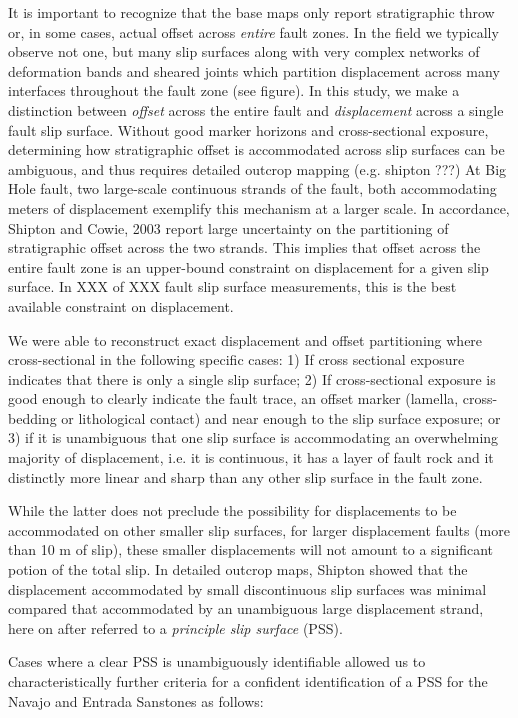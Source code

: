 \documentclass[12pt,a4paper]{article}
\begin{document}
It is important to recognize that the base maps only report stratigraphic throw or, in some cases, actual offset across \textit{entire} fault zones. In the field we typically observe not one, but many slip surfaces along with very complex networks of deformation bands and sheared joints which partition displacement across many interfaces throughout the fault zone (see figure). In this study, we make a distinction between \textit{offset} across the entire fault and \textit{displacement} across a single fault slip surface. Without good marker horizons and cross-sectional exposure, determining how stratigraphic offset is accommodated across slip surfaces can be ambiguous, and thus requires detailed outcrop mapping (e.g. shipton ???) At Big Hole fault, two large-scale continuous strands of the fault, both accommodating meters of displacement exemplify this mechanism at a larger scale. In accordance, Shipton and Cowie, 2003 report large uncertainty on the partitioning of stratigraphic offset across the two strands. This implies that offset across the entire fault zone is an upper-bound constraint on displacement for a given slip surface. In XXX of XXX fault slip surface measurements, this is the best available constraint on displacement. 

We were able to reconstruct exact displacement and offset partitioning where cross-sectional in the following specific cases: 1) If cross sectional exposure indicates that there is only a single slip surface; 2) If cross-sectional exposure is good enough to clearly indicate the fault trace, an offset marker (lamella, cross-bedding or lithological contact) and near enough to the slip surface exposure; or 3) if it is unambiguous that one slip surface is accommodating an overwhelming majority of displacement, i.e. it is continuous, it has a layer of fault rock and it distinctly more linear and sharp than any other slip surface in the fault zone. 

While the latter does not preclude the possibility for displacements to be accommodated on other smaller slip surfaces, for larger displacement faults (more than 10 m of slip), these smaller displacements will not amount to a significant potion of the total slip. In detailed outcrop maps, Shipton showed that the displacement accommodated by small discontinuous slip surfaces was minimal compared that accommodated by an unambiguous large displacement strand, here on after referred to a \textit{principle slip surface} (PSS). 

Cases where a clear PSS is unambiguously identifiable allowed us to characteristically further criteria for a confident identification of a PSS for the Navajo and Entrada Sanstones as follows:
\end{document}
